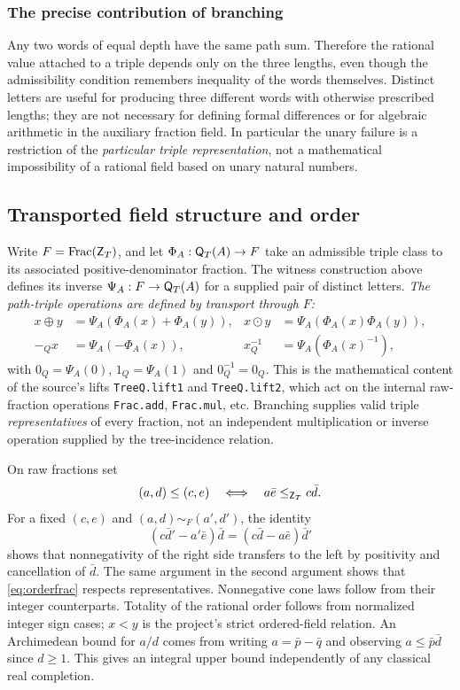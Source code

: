 \documentclass[11pt,reqno]{amsart}
\theoremstyle{definition}\newtheorem{definition}[theorem]{Definition}
\theoremstyle{remark}\newtheorem{remark}[theorem]{Remark}
\newcommand{\Frac}{\operatorname{Frac}}
\begin{document}
\subsubsection*{The precise contribution of branching}\label{supp:6-7}
Any two words of equal depth have the same path sum. Therefore the rational value attached to a triple depends only on the three lengths, even though the admissibility condition remembers inequality of the words themselves. Distinct letters are useful for producing three different words with otherwise prescribed lengths; they are not necessary for defining formal differences or for algebraic arithmetic in the auxiliary fraction field. In particular the unary failure is a restriction of the \emph{particular triple representation}, not a mathematical impossibility of a rational field based on unary natural numbers.
\medskip

\subsection{Transported field structure and order}\label{main:sub-18}
Write $F=\Frac(\Z)$, and let $\Phi_A:\mathsf Q_T(A)\to F$ take an admissible triple class to its associated positive-denominator fraction. The witness construction above defines its inverse $\Psi_A:F\to\mathsf Q_T(A)$ for a supplied pair of distinct letters. \emph{The path-triple operations are defined by transport through $F$:}
\begin{align}\label{eq:transport}
 x\oplus y&=\Psi_A(\Phi_A(x)+\Phi_A(y)), &
 x\odot y&=\Psi_A(\Phi_A(x)\Phi_A(y)),\\
 -_{Q}x&=\Psi_A(-\Phi_A(x)), &
 x^{-1}_{Q}&=\Psi_A(\Phi_A(x)^{-1}),
\end{align}
with $0_Q=\Psi_A(0)$, $1_Q=\Psi_A(1)$ and $0^{-1}_Q=0_Q$. This is the mathematical content of the source's lifts \texttt{TreeQ.lift1} and \texttt{TreeQ.lift2}, which act on the internal raw-fraction operations \texttt{Frac.add}, \texttt{Frac.mul}, etc. Branching supplies valid triple \emph{representatives} of every fraction, not an independent multiplication or inverse operation supplied by the tree-incidence relation.

On raw fractions set
\begin{equation}\label{eq:orderfrac}
(a,d)\le(c,e)\quad\Longleftrightarrow\quad a\bar e\le_{\mathsf Z_T} c\bar d.
\end{equation}
For a fixed $(c,e)$ and $(a,d)\sim_F(a',d')$, the identity
\[
(c\bar d'-a'\bar e)\bar d=(c\bar d-a\bar e)\bar d'
\]
shows that nonnegativity of the right side transfers to the left by positivity and cancellation of $\bar d$. The same argument in the second argument shows that \eqref{eq:orderfrac} respects representatives. Nonnegative cone laws follow from their integer counterparts. Totality of the rational order follows from normalized integer sign cases; $x<y$ is the project's strict ordered-field relation. An Archimedean bound for $a/d$ comes from writing $a=\bar p-\bar q$ and observing $a\le\bar p\bar d$ since $d\ge1$. This gives an integral upper bound independently of any classical real completion.
\end{document}
